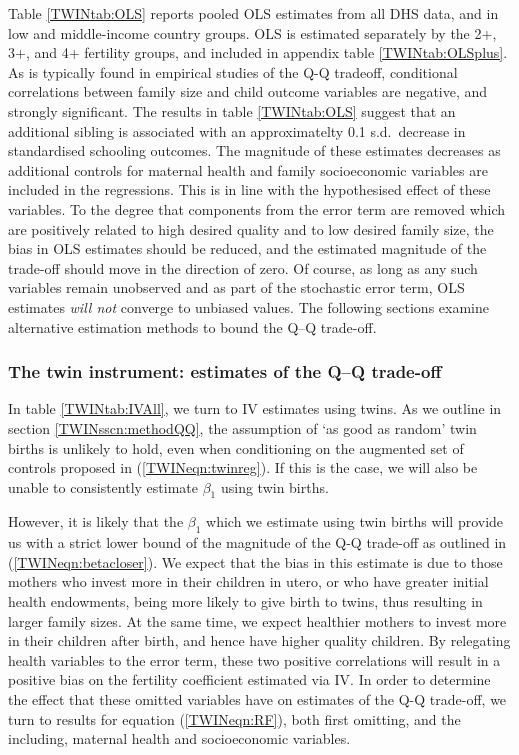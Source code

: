 \documentclass[subeqn]{article}
\begin{document}
\begin{spacing}{1.4}
Table \ref{TWINtab:OLS} reports pooled OLS estimates from all DHS data, and in 
low and middle-income country groups. OLS is estimated separately by the 2+, 3+,
and 4+ fertility groups, and included in appendix table \ref{TWINtab:OLSplus}.
As is typically found in empirical studies of the Q-Q tradeoff, conditional 
correlations between family size and child outcome variables are negative, and 
strongly significant.  The results in table \ref{TWINtab:OLS} suggest that an 
additional sibling is associated with an approximatelty 0.1 s.d.\ decrease in 
standardised schooling outcomes.  The magnitude of these estimates decreases
as additional controls for maternal health and family socioeconomic variables
are included in the regressions. This is in line with the hypothesised effect
of these variables.  To the degree that components from the error term are 
removed which are positively related to high desired quality and to low desired 
family size, the bias in OLS estimates should be reduced, and the estimated 
magnitude of the trade-off should move in the direction of zero. Of course, as 
long as any such variables remain unobserved and as part of the stochastic error 
term, OLS estimates \emph{will not} converge to unbiased values.  The following 
sections examine alternative estimation methods to bound the Q--Q trade-off.

\subsubsection{The twin instrument: estimates of the Q--Q trade-off}
In table \ref{TWINtab:IVAll}, we turn to IV estimates using twins.  As we 
outline in section \ref{TWINsscn:methodQQ}, the assumption of `as good as 
random' twin births is unlikely to hold, even when conditioning on the augmented
set of controls proposed in (\ref{TWINeqn:twinreg}). If this is the case, we 
will also be unable to consistently estimate $\beta_1$ using twin births.

However, it is likely that the $\beta_1$ which we estimate using twin births 
will provide us with a strict lower bound of the magnitude of the Q-Q trade-off 
as outlined in (\ref{TWINeqn:betacloser}). We expect that the bias in this 
estimate is due to those mothers who invest more in their children in utero, or 
who have greater initial health endowments, being more likely to give birth to 
twins, thus resulting in larger family sizes. At the same time, we expect 
healthier mothers to invest more in their children after birth, and hence have 
higher quality children. By relegating health variables to the error term, 
these two positive correlations will result in a positive bias on the fertility 
coefficient estimated via IV. In order to determine the effect that these 
omitted variables have on estimates of the Q-Q trade-off, we turn to results 
for equation (\ref{TWINeqn:RF}), both first omitting, and the including, 
maternal health and socioeconomic variables.


\end{spacing}
\end{document}
